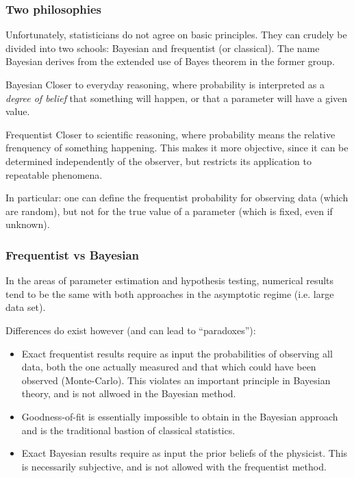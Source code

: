 \documentclass[9pt]{beamer}
\begin{document}
\begin{frame}
 \frametitle{Two philosophies}
 
 Unfortunately, statisticians do not agree on basic principles. They can crudely be divided into two schools: Bayesian and frequentist (or classical). The name Bayesian
 derives from the extended use of Bayes theorem in the former group.
 
 \begin{block}{Bayesian}
  Closer to everyday reasoning, where probability is interpreted as a \emph{degree of belief} that something will happen, or that a parameter will have a given value. 
 \end{block}
 
 \begin{block}{Frequentist}
  Closer to scientific reasoning, where probability means the relative frenquency of something happening. This makes it more objective, since it can be determined independently of the 
  observer, but restricts its application to repeatable phenomena.
  
  In particular: one can define the frequentist probability for observing data (which are random), but not for the true value of a parameter (which is fixed, even if unknown).
 \end{block}


\end{frame}

\begin{frame}
 \frametitle{Frequentist vs Bayesian}
 
 In the areas of parameter estimation and hypothesis testing, numerical results tend to be the same with both approaches in the asymptotic regime (i.e. large data set).
 
 Differences do exist however (and can lead to ``paradoxes''):
 
 \begin{itemize}
  \item Exact frequentist results require as input the probabilities of observing all data, both the one actually measured and that which could have been observed (Monte-Carlo). This violates an important principle in Bayesian theory, and is not allwoed in the Bayesian method.
  \item Goodness-of-fit is essentially impossible to obtain in the Bayesian approach and is the traditional bastion of classical statistics.
  \item Exact Bayesian results require as input the prior beliefs of the physicist. This is necessarily subjective, and is not allowed with the frequentist method.
 \end{itemize}
 
 

\end{frame}
\end{document}
